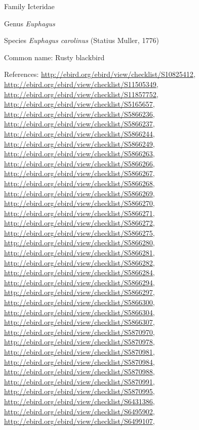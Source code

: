 \documentclass[9pt, article]{memoir}
\begin{document}
\begin{multicols}{2}
\vspace{6pt}\noindent\hspace{24pt}Family Icteridae


\vspace{6pt}\noindent\hspace{30pt}Genus \textit{Euphagus}


\vspace{6pt}\noindent\hspace{36pt}Species \textit{Euphagus carolinus} (Statius Muller, 1776)


Common name: Rusty blackbird

References: 
\url{http://ebird.org/ebird/view/checklist/S10825412}, 
\url{http://ebird.org/ebird/view/checklist/S11505349}, 
\url{http://ebird.org/ebird/view/checklist/S11857752}, 
\url{http://ebird.org/ebird/view/checklist/S5165657}, 
\url{http://ebird.org/ebird/view/checklist/S5866236}, 
\url{http://ebird.org/ebird/view/checklist/S5866237}, 
\url{http://ebird.org/ebird/view/checklist/S5866244}, 
\url{http://ebird.org/ebird/view/checklist/S5866249}, 
\url{http://ebird.org/ebird/view/checklist/S5866263}, 
\url{http://ebird.org/ebird/view/checklist/S5866266}, 
\url{http://ebird.org/ebird/view/checklist/S5866267}, 
\url{http://ebird.org/ebird/view/checklist/S5866268}, 
\url{http://ebird.org/ebird/view/checklist/S5866269}, 
\url{http://ebird.org/ebird/view/checklist/S5866270}, 
\url{http://ebird.org/ebird/view/checklist/S5866271}, 
\url{http://ebird.org/ebird/view/checklist/S5866272}, 
\url{http://ebird.org/ebird/view/checklist/S5866275}, 
\url{http://ebird.org/ebird/view/checklist/S5866280}, 
\url{http://ebird.org/ebird/view/checklist/S5866281}, 
\url{http://ebird.org/ebird/view/checklist/S5866282}, 
\url{http://ebird.org/ebird/view/checklist/S5866284}, 
\url{http://ebird.org/ebird/view/checklist/S5866294}, 
\url{http://ebird.org/ebird/view/checklist/S5866297}, 
\url{http://ebird.org/ebird/view/checklist/S5866300}, 
\url{http://ebird.org/ebird/view/checklist/S5866304}, 
\url{http://ebird.org/ebird/view/checklist/S5866307}, 
\url{http://ebird.org/ebird/view/checklist/S5870970}, 
\url{http://ebird.org/ebird/view/checklist/S5870978}, 
\url{http://ebird.org/ebird/view/checklist/S5870981}, 
\url{http://ebird.org/ebird/view/checklist/S5870984}, 
\url{http://ebird.org/ebird/view/checklist/S5870988}, 
\url{http://ebird.org/ebird/view/checklist/S5870991}, 
\url{http://ebird.org/ebird/view/checklist/S5870995}, 
\url{http://ebird.org/ebird/view/checklist/S6431386}, 
\url{http://ebird.org/ebird/view/checklist/S6495902}, 
\url{http://ebird.org/ebird/view/checklist/S6499107}, 

\end{multicols}
\end{document}
